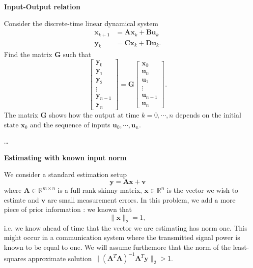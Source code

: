 \documentclass[12pt]{exam}
\begin{document}
\begin{questions}


  \question \textbf{Input-Output relation}
  \noaddpoints

  Consider the discrete-time linear dynamical system
  \[
  \begin{aligned}
    \bm{x}_{k+1} & = \bm{Ax}_k + \bm{Bu}_k \\
    \bm{y}_k & = \bm{Cx}_k + \bm{Du}_k.
  \end{aligned}
  \]
  Find the matrix $\bm{G}$ such that
  \[
  \begin{bmatrix}
    \bm{y}_0 \\ \bm{y}_1 \\ \bm{y}_2 \\ \vdots \\ \bm{y}_{n-1} \\ \bm{y}_n
  \end{bmatrix}
  =
  \bm{G}
  \begin{bmatrix}
    \bm{x}_0 \\
    \bm{u}_0 \\
    \bm{u}_1 \\
    \vdots \\
    \bm{u}_{n-1} \\
    \bm{u}_n
  \end{bmatrix}.
  \]
  The matrix $\bm{G}$ shows  how the output at time $k = 0, \cdots, n$ depends on the initial state $\bm{x}_0$ and the sequence of inputs $\bm{u}_0, \cdots, \bm{u}_n$.


  \begin{solution}
    {\color{blue}
      \ldots
    }
  \end{solution}





  \question \textbf{Estimating with known input norm}

  We consider a standard estimation setup
  \[
  \bm{y} = \bm{Ax} + \bm{v}
  \]
  where $\bm{A} \in \mathbb{R}^{m \times n}$ is a full rank skinny matrix, $\bm{x} \in \mathbb{R}^n$ is the vector we wish to estimte and $\bm{v}$ are small measurement errors.
  In this problem, we add a more piece of prior information : we known that
  \[
  \| \bm{x} \|_2 = 1,
  \]
  i.e. we know ahead of time that the vector we are estimating has norm one.
  This might occur in a communication system where the transmitted signal power is known to be equal to one.
  We will assume furthemore that the norm of the least-squares approximate solution $\| \left( \bm{A}^T \bm{A} \right)^{-1} \bm{A}^T \bm{y} \|_2 > 1$.


\end{questions}
\end{document}
